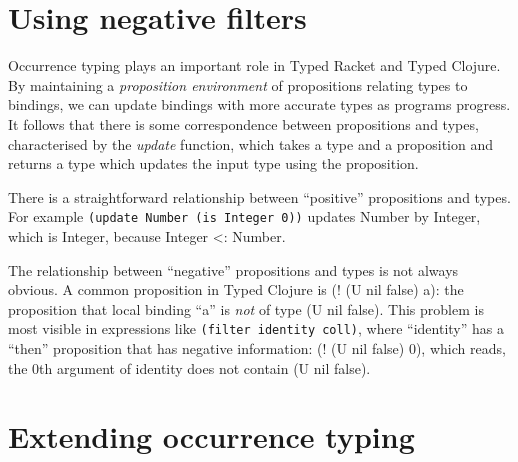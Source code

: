 \documentclass{sigplanconf}
\begin{document}


\section{Using negative filters}

Occurrence typing plays an important role in Typed Racket and Typed Clojure.
By maintaining a \emph{proposition environment} of propositions relating types to
bindings, we can update bindings with more accurate types as programs progress.
It follows that there is some correspondence between propositions and types,
characterised by the \emph{update} function, which takes a type and a proposition
and returns a type which updates the input type using the proposition.

There is a straightforward relationship between ``positive'' propositions and types.
For example 
{\tt (update Number (is Integer 0))}
updates Number by Integer, which is Integer, because Integer <: Number.

The relationship between ``negative'' propositions and types is not always obvious.
A common proposition in Typed Clojure is (! (U nil false) a): the proposition that
local binding ``a'' is \emph{not} of type (U nil false).
This problem is most visible in expressions like {\tt (filter identity coll)}, where
``identity'' has a ``then'' proposition that has negative information: (! (U nil false) 0),
which reads, the 0th argument of identity does not contain (U nil false).

\section{Extending occurrence typing}
\end{document}
